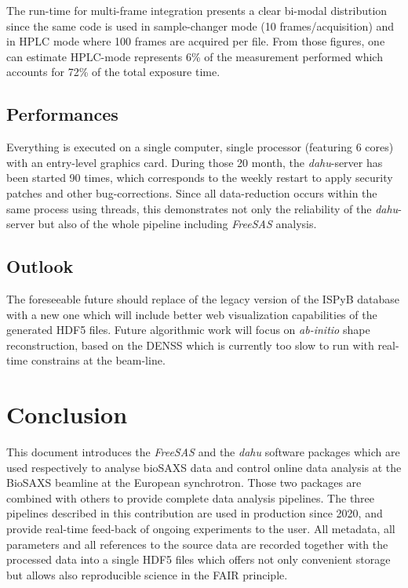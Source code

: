 \documentclass[preprint]{iucr}              %
\begin{document}
The run-time for multi-frame integration presents a clear bi-modal distribution since the same code is used in sample-changer mode (10 frames/acquisition) and in HPLC mode where 100 frames are acquired per file.
From those figures, one can estimate HPLC-mode represents 6\% of the measurement performed which accounts for 72\% of the total exposure time.

\subsection{Performances}

Everything is executed on a single computer, single processor (featuring 6 cores) with an entry-level graphics card. 
During those 20 month, the \textit{dahu}-server has been started 90 times, which corresponds to the weekly restart to apply security patches and other bug-corrections. 
Since all data-reduction occurs within the same process using threads, this demonstrates not only the reliability of the \textit{dahu}-server 
but also of the whole pipeline including \textit{FreeSAS} analysis.
\subsection{Outlook}

The foreseeable future should replace of the legacy version of the ISPyB database with a new one which will include better web visualization capabilities of the generated HDF5 files.
Future algorithmic work will focus on \textit{ab-initio} shape reconstruction, based on the DENSS \cite{denss} which is currently too slow to run with real-time constrains at the beam-line.

\section{Conclusion}

This document introduces the \textit{FreeSAS} and the \textit{dahu} software packages which are used respectively to analyse bioSAXS data 
and control online data analysis at the BioSAXS beamline at the European synchrotron. 
Those two packages are combined with others to provide complete data analysis pipelines.
The three pipelines described in this contribution are used in production since 2020, and provide real-time feed-back of ongoing experiments to the user.
All metadata, all parameters and all references to the source data are recorded together with the processed data into a single HDF5 files which offers 
not only convenient storage but allows also reproducible science in the FAIR principle. 
\end{document}
